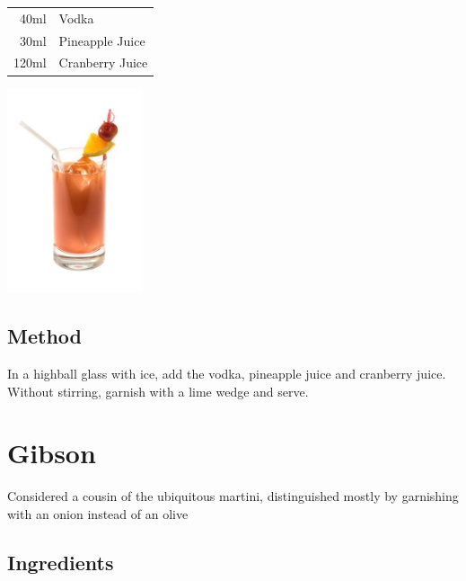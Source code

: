\documentclass[12pt, letterpaper]{article}
\begin{document}
\begin{multicols}{2}

\begin{tabular} { r | l}
    40ml & Vodka \\
    30ml & Pineapple Juice  \\
    120ml & Cranberry Juice  \\
\end{tabular}

\includegraphics[height=6cm]{baybreeze}

\end{multicols}

\subsection*{Method}
In a highball glass with ice, add the vodka, pineapple juice and cranberry juice.
Without stirring, garnish with a lime wedge and serve.

\pagebreak
\section{Gibson}

Considered a cousin of the ubiquitous martini, distinguished mostly by garnishing with an onion instead of an olive

\subsection*{Ingredients}
\end{document}
